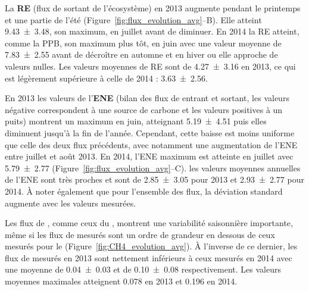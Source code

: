La \textbf{RE} (flux de \coo sortant de l'écosystème) en 2013 augmente pendant le printemps et une partie de l'été (Figure~\ref{fig:flux_evolution_avg}--B).
Elle atteint \SI{9.43(348)}{\uml}, son maximum, en juillet avant de diminuer.
En 2014 la RE atteint, comme la PPB, son maximum plus tôt, en juin avec une valeur moyenne de \SI{7.83(255)}{\uml} avant de décroître en automne et en hiver ou elle approche de valeurs nulles.
Les valeurs moyennes de RE sont de \SI{4.27(316)}{\uml} en 2013, ce qui est légèrement supérieure à celle de 2014 : \SI{3.63(256)}{\uml}.

En 2013 les valeurs de l'\textbf{ENE} (bilan des flux de \coo entrant et sortant, les valeurs négative correspondent à une source de carbone et les valeurs positives à un puits) montrent un maximum en juin, atteignant \SI{5.19(451)}{\uml} puis elles diminuent jusqu'à la fin de l'année.
Cependant, cette baisse est moins uniforme que celle des deux flux précédents, avec notamment une augmentation de l'ENE entre juillet et août 2013.
En 2014, l'ENE maximum est atteinte en juillet avec \SI{5.79(277)}{\uml} (Figure~\ref{fig:flux_evolution_avg}--C).
les valeurs moyennes annuelles de l'ENE sont très proches et sont de \SI{2.85(305)}{\uml} pour 2013 et \SI{2.93(277)}{\uml} pour 2014.
À noter également que pour l'ensemble des flux, la déviation standard augmente avec les valeurs mesurées.


Les flux de \textbf{\chh}, comme ceux du \coo, montrent une variabilité saisonnière importante, même si les flux de \chh mesurés sont un ordre de grandeur en dessous de ceux mesurés pour le \coo (Figure~\ref{fig:CH4_evolution_avg}).
À l'inverse de ce dernier, les flux de \chh mesurés en 2013 sont nettement inférieurs à ceux mesurés en 2014 avec une moyenne de \num{0.04(003)} et de \SI{0.10(008)}{\uml} respectivement.
Les valeurs moyennes maximales atteignent \num{0.078} en 2013 et \SI{0.196}{\uml} en 2014.

